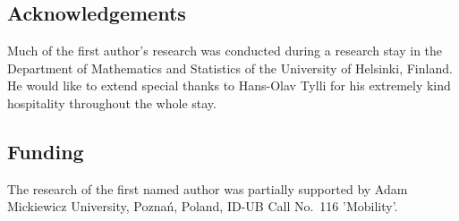 \documentclass[10pt,leqno]{amsart}
\theoremstyle{definition}
\begin{document}
\subsection*{Acknowledgements}
Much of the first author's research was conducted during a research stay in the Department of Mathematics and Statistics of the University of Helsinki, Finland. He would like to extend special thanks to Hans-Olav Tylli for his extremely kind hospitality throughout the whole stay.   

\subsection*{Funding}
The research of the first named author was partially supported by Adam Mickiewicz University, Pozna\'n, Poland, ID-UB Call No.~116 'Mobility'.
\end{document}
